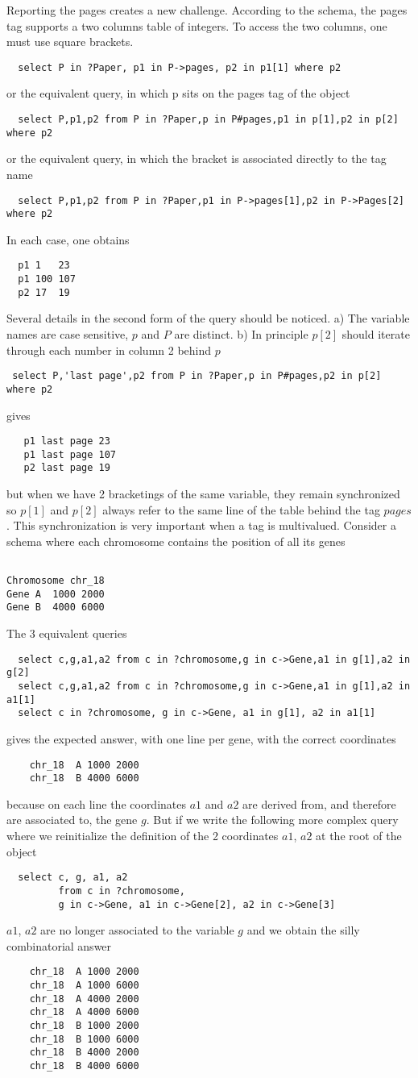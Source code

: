 \documentclass[11pt]{article}
\newcommand{\BL}{\begin{lstlisting}}
\begin{document}
Reporting the pages creates a new challenge. According to the schema, the pages tag supports a two columns table of integers.
 To access the two columns, one must use square brackets.
\BL
  select P in ?Paper, p1 in P->pages, p2 in p1[1] where p2
\end{lstlisting}
or the equivalent query, in which p sits on the pages tag of the object
\BL
  select P,p1,p2 from P in ?Paper,p in P#pages,p1 in p[1],p2 in p[2] where p2
\end{lstlisting}
or the equivalent query, in which the bracket is associated directly to the tag name
\BL
  select P,p1,p2 from P in ?Paper,p1 in P->pages[1],p2 in P->Pages[2] where p2
\end{lstlisting}

In each case, one obtains
\BL
  p1 1   23
  p1 100 107
  p2 17  19
\end{lstlisting}

Several details in the second form of the query should be noticed.
  a) The variable names are case sensitive, $p$ and $P$ are distinct. 
  b) In principle $p[2]$ should iterate through each number in column 2 behind $p$
\BL
 select P,'last page',p2 from P in ?Paper,p in P#pages,p2 in p[2] where p2
\end{lstlisting}
gives
\BL
   p1 last page 23
   p1 last page 107
   p2 last page 19
\end{lstlisting}
but when we have 2 bracketings of the same variable, they remain synchronized so $p[1]$ 
and $p[2]$ always refer to the same line of the table behind the tag $pages$.
This synchronization is very important when a tag is multivalued. Consider a schema
where each chromosome contains the position of all its genes
\BL

Chromosome chr_18
Gene A  1000 2000
Gene B  4000 6000
\end{lstlisting}

The 3 equivalent queries
\BL
  select c,g,a1,a2 from c in ?chromosome,g in c->Gene,a1 in g[1],a2 in g[2]
  select c,g,a1,a2 from c in ?chromosome,g in c->Gene,a1 in g[1],a2 in a1[1]
  select c in ?chromosome, g in c->Gene, a1 in g[1], a2 in a1[1]
\end{lstlisting}
gives the expected answer, with one line per gene, with the correct coordinates
\BL
    chr_18  A 1000 2000
    chr_18  B 4000 6000
\end{lstlisting}
because on each line the coordinates $a1$ and $a2$ are derived from, and therefore are associated to, the gene $g$.
But if we write the following more complex query where we reinitialize the definition 
of the 2 coordinates $a1$, $a2$ at the root of the object
\BL
  select c, g, a1, a2 
         from c in ?chromosome,
         g in c->Gene, a1 in c->Gene[2], a2 in c->Gene[3]
\end{lstlisting}
$a1$, $a2$ are no longer associated to the variable $g$ and 
we obtain the silly combinatorial answer
\BL
    chr_18  A 1000 2000
    chr_18  A 1000 6000
    chr_18  A 4000 2000
    chr_18  A 4000 6000
    chr_18  B 1000 2000
    chr_18  B 1000 6000
    chr_18  B 4000 2000
    chr_18  B 4000 6000
\end{lstlisting}
\end{document}
